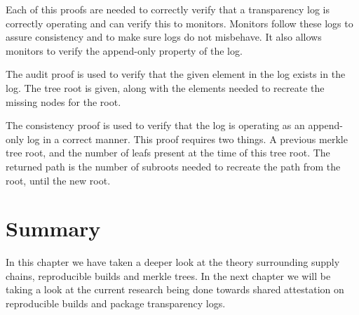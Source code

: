 \documentclass[../Main/thesis.tex]{subfiles}
\begin{document}
Each of this proofs are needed to correctly verify that a transparency log
is correctly operating and can verify this to monitors.  Monitors follow
these logs to assure consistency and to make sure logs do not misbehave. It
also allows monitors to verify the append-only property of the log.

The audit proof is used to  verify that the given element in the log exists
in the log. The tree root is given, along with the elements needed to
recreate the missing nodes for the root.

The consistency proof is used to verify that the log is operating as an
append-only log in a correct manner. This proof requires two things. A
previous merkle tree root, and the number of leafs present at the time of
this tree root. The returned path is the number of subroots needed to
recreate the path from the root, until the new root.


\section*{Summary}\label{sec:summary-theory} 
In this chapter we have taken a deeper look at the theory surrounding supply
chains, reproducible builds and merkle trees. In the next chapter we will be
taking a look at the current research being done towards shared attestation on
reproducible builds and package transparency logs.
\blankpage
\end{document}
